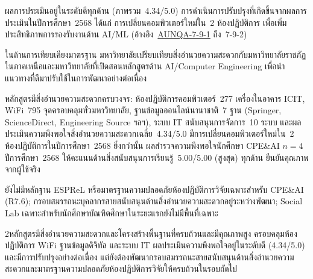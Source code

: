 ผลการประเมินอยู่ในระดับดีทุกด้าน (ภาพรวม~4.34/5.0) การดำเนินการปรับปรุงที่เกิดขึ้นจากผลการประเมินในปีการศึกษา~2568 ได้แก่ การเปลี่ยนคอมพิวเตอร์ใหม่ใน~2 ห้องปฏิบัติการ เพื่อเพิ่มประสิทธิภาพการรองรับงานด้าน AI/ML (อ้างอิง~\hyperlink{ref:AUNQA-7-9-1}{AUNQA-7-9-1} ถึง~7-9-2)

ในด้านการเทียบเคียงมาตรฐาน มหาวิทยาลัยเปรียบเทียบสิ่งอำนวยความสะดวกกับมหาวิทยาลัยราชภัฏในภาคเหนือและมหาวิทยาลัยที่เปิดสอนหลักสูตรด้าน AI/Computer Engineering เพื่อนำแนวทางที่ดีมาปรับใช้ในการพัฒนาอย่างต่อเนื่อง

\begin{strengthbox}
หลักสูตรมีสิ่งอำนวยความสะดวกครบวงจร: ห้องปฏิบัติการคอมพิวเตอร์~277 เครื่องในอาคาร ICIT, WiFi~795 จุดครอบคลุมทั่วมหาวิทยาลัย, ฐานข้อมูลออนไลน์นานาชาติ~7 ฐาน (Springer, ScienceDirect, Engineering Source ฯลฯ), ระบบ IT สนับสนุนการจัดการ~10 ระบบ และผลประเมินความพึงพอใจสิ่งอำนวยความสะดวกเฉลี่ย~4.34/5.0 มีการเปลี่ยนคอมพิวเตอร์ใหม่ใน~2 ห้องปฏิบัติการในปีการศึกษา~2568 ยิ่งกว่านั้น ผลสำรวจความพึงพอใจนักศึกษา CPE\&AI $n=4$ ปีการศึกษา~2568 ให้คะแนนด้านสิ่งสนับสนุนการเรียนรู้~5.00/5.00 (สูงสุด) ทุกด้าน ยืนยันคุณภาพจากผู้ใช้จริง
\end{strengthbox}

\begin{weaknessbox}
ยังไม่มีหลักฐาน ESPReL หรือมาตรฐานความปลอดภัยห้องปฏิบัติการวิจัยเฉพาะสำหรับ CPE\&AI (R7.6); กรอบสมรรถนะบุคลากรสายสนับสนุนด้านสิ่งอำนวยความสะดวกอยู่ระหว่างพัฒนา; Social Lab เฉพาะสำหรับนักศึกษาบัณฑิตศึกษาในระยะแรกยังไม่มีพื้นที่เฉพาะ
\end{weaknessbox}

\begin{selfassessmentbox}{2}{หลักสูตรมีสิ่งอำนวยความสะดวกและโครงสร้างพื้นฐานที่ครบถ้วนและมีคุณภาพสูง ครอบคลุมห้องปฏิบัติการ WiFi ฐานข้อมูลดิจิทัล และระบบ IT ผลประเมินความพึงพอใจอยู่ในระดับดี (4.34/5.0) และมีการปรับปรุงอย่างต่อเนื่อง แต่ยังต้องพัฒนากรอบสมรรถนะสายสนับสนุนด้านสิ่งอำนวยความสะดวกและมาตรฐานความปลอดภัยห้องปฏิบัติการวิจัยให้ครบถ้วนในรอบถัดไป}
\end{selfassessmentbox}

\begin{evidencelist}
\end{evidencelist}
